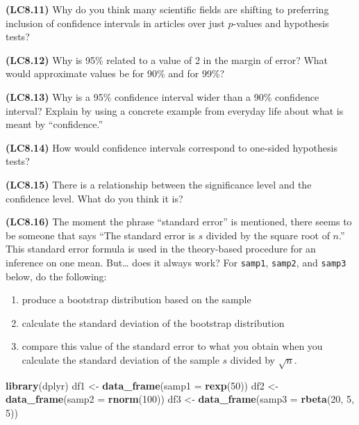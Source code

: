 \documentclass[]{tufte-book}
\newenvironment{Shaded}{\begin{snugshade}}{\end{snugshade}}
\newcommand{\KeywordTok}[1]{\textcolor[rgb]{0.13,0.29,0.53}{\textbf{{#1}}}}
\newcommand{\DataTypeTok}[1]{\textcolor[rgb]{0.13,0.29,0.53}{{#1}}}
\newcommand{\DecValTok}[1]{\textcolor[rgb]{0.00,0.00,0.81}{{#1}}}
\newcommand{\StringTok}[1]{\textcolor[rgb]{0.31,0.60,0.02}{{#1}}}
\newcommand{\NormalTok}[1]{{#1}}
\providecommand{\tightlist}{%
  \setlength{\itemsep}{0pt}\setlength{\parskip}{0pt}}
\begin{document}
\textbf{(LC8.11)} Why do you think many scientific fields are shifting
to preferring inclusion of confidence intervals in articles over just
\(p\)-values and hypothesis tests?

\textbf{(LC8.12)} Why is 95\% related to a value of 2 in the margin of
error? What would approximate values be for 90\% and for 99\%?

\textbf{(LC8.13)} Why is a 95\% confidence interval wider than a 90\%
confidence interval? Explain by using a concrete example from everyday
life about what is meant by ``confidence.''

\textbf{(LC8.14)} How would confidence intervals correspond to one-sided
hypothesis tests?

\textbf{(LC8.15)} There is a relationship between the significance level
and the confidence level. What do you think it is?

\textbf{(LC8.16)} The moment the phrase ``standard error'' is mentioned,
there seems to be someone that says ``The standard error is \(s\)
divided by the square root of \(n\).'' This standard error formula is
used in the theory-based procedure for an inference on one mean.
But\ldots{} does it always work? For \texttt{samp1}, \texttt{samp2}, and
\texttt{samp3} below, do the following:

\begin{enumerate}
\def\labelenumi{\arabic{enumi}.}
\tightlist
\item
  produce a bootstrap distribution based on the sample
\item
  calculate the standard deviation of the bootstrap distribution
\item
  compare this value of the standard error to what you obtain when you
  calculate the standard deviation of the sample \(s\) divided by
  \(\sqrt{n}\).
\end{enumerate}

\begin{Shaded}
\begin{Highlighting}[]
\KeywordTok{library}\NormalTok{(dplyr)}
\NormalTok{df1 <-}\StringTok{ }\KeywordTok{data_frame}\NormalTok{(}\DataTypeTok{samp1 =} \KeywordTok{rexp}\NormalTok{(}\DecValTok{50}\NormalTok{))}
\NormalTok{df2 <-}\StringTok{ }\KeywordTok{data_frame}\NormalTok{(}\DataTypeTok{samp2 =} \KeywordTok{rnorm}\NormalTok{(}\DecValTok{100}\NormalTok{))}
\NormalTok{df3 <-}\StringTok{ }\KeywordTok{data_frame}\NormalTok{(}\DataTypeTok{samp3 =} \KeywordTok{rbeta}\NormalTok{(}\DecValTok{20}\NormalTok{, }\DecValTok{5}\NormalTok{, }\DecValTok{5}\NormalTok{))}
\end{Highlighting}
\end{Shaded}
\end{document}

